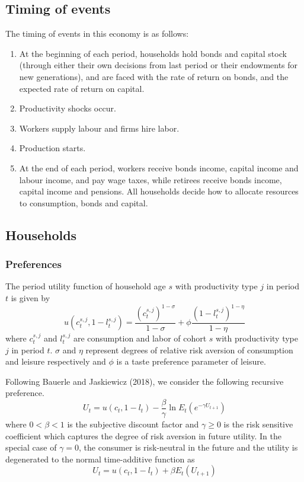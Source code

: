 \documentclass[12pt]{article}
\begin{document}
\subsection{Timing of events}
The timing of events in this economy is as follows:
\begin{enumerate}
	\item At the beginning of each period, households hold bonds and capital stock (through either their own decisions from last period or their endowments for new generations), and are faced with the rate of return on bonds, and the expected rate of return on capital.
	\item Productivity shocks occur.
	\item Workers supply labour and firms hire labor.
	\item Production starts. 
	\item At the end of each period, workers receive bonds income, capital income and labour income, and pay wage taxes, while retirees receive bonds income, capital income and pensions. All households decide how to allocate resources to consumption, bonds and capital. 
\end{enumerate}

\subsection{Households}
\subsubsection{Preferences}
The period utility function of household age $s$ with productivity type $j$ in period $t$ is given by
\begin{equation}
u\left(c^{s,j}_t,1-l^{s,j}_t\right)=\frac{(c^{s,j}_t)^{1-\sigma}}{1-\sigma}+\phi \frac{(1-l^{s,j}_t)^{1-\eta}}{1-\eta}
\end{equation}
where $c^{s,j}_t$ and $l^{s,j}_t$ are consumption and labor of cohort $s$ with productivity type $j$ in period $t$. $\sigma$ and $\eta$ represent degrees of relative risk aversion of consumption and leisure respectively and $\phi$ is a taste preference parameter of leisure.

Following Bauerle and Jaskiewicz (2018), we consider the following recursive preference.
\begin{equation}
	U_t=u(c_t,{1-l}_t) - {\frac{\beta}{\gamma}}\ln E_t(e^{{-\gamma}{U_{t+1}}})
\end{equation}
where $0<\beta<1$ is the subjective discount factor and $\gamma\geq 0$ is the risk sensitive coefficient which captures the degree of risk aversion in future utility. In the special case of $\gamma=0$, the consumer is risk-neutral in the future and the utility is degenerated to the normal time-additive function as
\begin{equation}
U_t=u(c_t,{1-l}_t) + \beta E_t(U_{t+1})
\end{equation}
\end{document}

